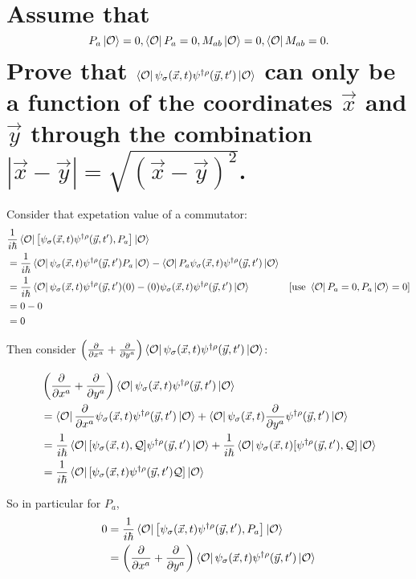 \section{Assume that $$P_a \ket{\mathcal{O}} = 0, \bra{\mathcal{O}}P_a = 0, M_{ab}\ket{\mathcal{O}}=0, \bra{\mathcal{O}}M_{ab}=0.$$ Prove that $\bra{\mathcal{O}}\psi_\sigma(\vec{x},t)\psi^{\dagger\rho}(\vec{y},t')\ket{\mathcal{O}}$ can only be a function of the coordinates $\vec{x}$ and $\vec{y}$ through the combination $|\vec{x}-\vec{y}| = \sqrt{(\vec{x}-\vec{y})^2}$.}

Consider that expetation value of a commutator:
\begin{align*}
    &\frac{1}{i\hbar} \bra{\mathcal{O}} \left[\psi_\sigma(\vec{x},t)\psi^{\dagger\rho}(\vec{y},t'), P_a\right] \ket{\mathcal{O}} \\
    &= \frac{1}{i\hbar} \bra{\mathcal{O}} \psi_\sigma(\vec{x},t)\psi^{\dagger\rho}(\vec{y},t')P_a \ket{\mathcal{O}} - \bra{\mathcal{O}}P_a\psi_\sigma(\vec{x},t)\psi^{\dagger\rho}(\vec{y},t') \ket{\mathcal{O}} \\ 
    &= \frac{1}{i\hbar} \bra{\mathcal{O}} \psi_\sigma(\vec{x},t)\psi^{\dagger\rho}(\vec{y},t')(0) - (0)\psi_\sigma(\vec{x},t)\psi^{\dagger\rho}(\vec{y},t') \ket{\mathcal{O}}  &[\text{use }\bra{\mathcal{O}}P_a = 0, P_a\ket{\mathcal{O}} = 0]\\ 
    &= 0 - 0 \\ 
    &= 0 \\ 
\end{align*}

Then consider $\left(\frac{\partial}{\partial x^a} + \frac{\partial}{\partial y^a}\right)\bra{\mathcal{O}} \psi_\sigma(\vec{x},t)\psi^{\dagger\rho}(\vec{y},t') \ket{\mathcal{O}}$:

\begin{align*}
    &\left(\frac{\partial}{\partial x^a} + \frac{\partial}{\partial y^a}\right)\bra{\mathcal{O}} \psi_\sigma(\vec{x},t)\psi^{\dagger\rho}(\vec{y},t') \ket{\mathcal{O}} \\
    &= \bra{\mathcal{O}} \frac{\partial}{\partial x^a}\psi_\sigma(\vec{x},t)\psi^{\dagger\rho}(\vec{y},t')\ket{\mathcal{O}} + \bra{\mathcal{O}}\psi_\sigma(\vec{x},t)\frac{\partial}{\partial y^a}\psi^{\dagger\rho}(\vec{y},t') \ket{\mathcal{O}} \\
    &= \frac{1}{i\hbar}\bra{\mathcal{O}} [\psi_\sigma(\vec{x},t), \mathcal{Q}]\psi^{\dagger\rho}(\vec{y},t')\ket{\mathcal{O}} + \frac{1}{i\hbar}\bra{\mathcal{O}}\psi_\sigma(\vec{x},t)[\psi^{\dagger\rho}(\vec{y},t'), \mathcal{Q}] \ket{\mathcal{O}} \\
    &= \frac{1}{i\hbar}\bra{\mathcal{O}} [\psi_\sigma(\vec{x},t)\psi^{\dagger\rho}(\vec{y},t') \mathcal{Q}]\ket{\mathcal{O}} \\
\end{align*}

So in particular for $P_a$,
\begin{align*}
    0 &= \frac{1}{i\hbar} \bra{\mathcal{O}} \left[\psi_\sigma(\vec{x},t)\psi^{\dagger\rho}(\vec{y},t'), P_a\right] \ket{\mathcal{O}} \\
    &= \left(\frac{\partial}{\partial x^a} + \frac{\partial}{\partial y^a}\right)\bra{\mathcal{O}} \psi_\sigma(\vec{x},t)\psi^{\dagger\rho}(\vec{y},t') \ket{\mathcal{O}} \\ 
\end{align*}

